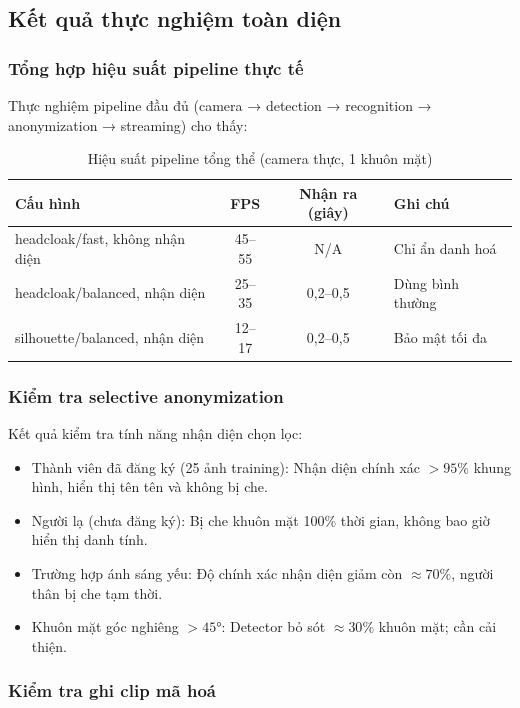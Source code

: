 \subsection{Kết quả thực nghiệm toàn diện}
\label{subsec:toanbo}

\subsubsection{Tổng hợp hiệu suất pipeline thực tế}

Thực nghiệm pipeline đầu đủ (camera → detection → recognition → anonymization → streaming) cho thấy:

\begin{table}[H]
\centering
\caption{Hiệu suất pipeline tổng thể (camera thực, 1 khuôn mặt)}
\label{tab:pipeline_perf}
{\small
\begin{tabularx}{\textwidth}{|X|c|c|l|}
\hline
\textbf{Cấu hình} & \textbf{FPS} & \textbf{Nhận ra (giây)} & \textbf{Ghi chú} \\
\hline
headcloak/fast, không nhận diện & 45--55 & N/A & Chỉ ẩn danh hoá \\
headcloak/balanced, nhận diện & 25--35 & 0,2--0,5 & Dùng bình thường \\
silhouette/balanced, nhận diện & 12--17 & 0,2--0,5 & Bảo mật tối đa \\
\hline
\end{tabularx}
}
\end{table}

\subsubsection{Kiểm tra selective anonymization}

Kết quả kiểm tra tính năng nhận diện chọn lọc:
\begin{itemize}
    \item Thành viên đã đăng ký (25 ảnh training): Nhận diện chính xác $> 95\%$ khung hình, hiển thị tên tên và không bị che.
    \item Người lạ (chưa đăng ký): Bị che khuôn mặt 100\% thời gian, không bao giờ hiển thị danh tính.
    \item Trường hợp ánh sáng yếu: Độ chính xác nhận diện giảm còn $\approx 70\%$, người thân bị che tạm thời.
    \item Khuôn mặt góc nghiêng $> 45°$: Detector bỏ sót $\approx 30\%$ khuôn mặt; cần cải thiện.
\end{itemize}

\subsubsection{Kiểm tra ghi clip mã hoá}


